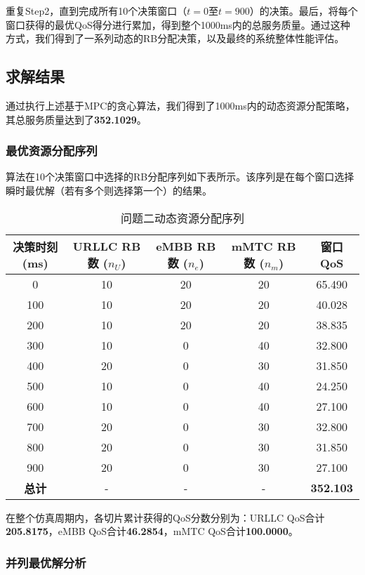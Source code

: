 重复Step2，直到完成所有10个决策窗口（$t=0$至$t=900$）的决策。最后，将每个窗口获得的最优QoS得分进行累加，得到整个1000ms内的总服务质量。通过这种方式，我们得到了一系列动态的RB分配决策，以及最终的系统整体性能评估。

\subsection{求解结果}

通过执行上述基于MPC的贪心算法，我们得到了1000ms内的动态资源分配策略，其总服务质量达到了\textbf{352.1029}。

\subsubsection{最优资源分配序列}

算法在10个决策窗口中选择的RB分配序列如下表所示。该序列是在每个窗口选择瞬时最优解（若有多个则选择第一个）的结果。

\begin{table}[H]
\centering
\caption{问题二动态资源分配序列}
\label{tab:q2_decision_sequence}
\begin{tabular}{ccccc}
\hline
\textbf{决策时刻 (ms)} & \textbf{URLLC RB数 ($n_U$)} & \textbf{eMBB RB数 ($n_e$)} & \textbf{mMTC RB数 ($n_m$)} & \textbf{窗口QoS} \\
\hline
0 & 10 & 20 & 20 & 65.490 \\
100 & 10 & 20 & 20 & 40.028 \\
200 & 10 & 20 & 20 & 38.835 \\
300 & 10 & 0 & 40 & 32.800 \\
400 & 20 & 0 & 30 & 31.850 \\
500 & 10 & 0 & 40 & 24.250 \\
600 & 10 & 0 & 40 & 27.100 \\
700 & 20 & 0 & 30 & 32.800 \\
800 & 20 & 0 & 30 & 31.850 \\
900 & 20 & 0 & 30 & 27.100 \\
\hline
\textbf{总计} & - & - & - & \textbf{352.103} \\
\hline
\end{tabular}
\end{table}

在整个仿真周期内，各切片累计获得的QoS分数分别为：URLLC QoS合计\textbf{205.8175}，eMBB QoS合计\textbf{46.2854}，mMTC QoS合计\textbf{100.0000}。

\subsubsection{并列最优解分析}

